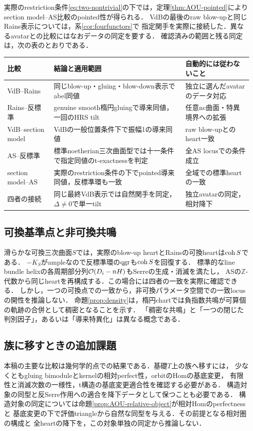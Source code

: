 実際のrestriction条件\eqref{eq:two-nontrivial}の下では，定理\ref{thm:AOU-pointed}により
section model--AS比較のpointed性が得られる．
VdBの最後のraw blow-upと同じRains表示については，系\ref{cor:fourfunctors}で
指定関手を実際に接続した．異なるavatarとの比較にはなおデータの同定を要する．
確認済みの範囲と残る同定は，次の表のとおりである．
\begin{center}
\small
\begin{tabular}{p{}p{}p{}}
\toprule
比較 & 結論と適用範囲 & 自動的には従わないこと\\
\midrule
VdB--Rains & 同じblow-up・gluing・blow-down表示でabel同値 & 独立に選んだavatarのデータ対応\\
Rains--反標準 & genuine smooth楕円gluingで導来同値，一回のHRS tilt & 任意nc曲面・特異境界への拡張\\
VdB--section model & VdBの一般位置条件下で振幅1の導来同値 & raw blow-upとのheart一致\\
AS--反標準 & 標準noetherian三次曲面型では十一条件で指定同値のt-exactnessを判定 & 全AS locusでの条件成立\\
section model--AS & 実際のrestriction条件の下でpointed導来同値，反標準環も一致 & 全域での標準heartの一致\\
四者の接続 & 同じ最終VdB表示では自然関手を同定，$\Delta\ne0$で単一tilt & 独立avatarの同定，相対降下\\
\bottomrule
\end{tabular}
\end{center}

\subsection{可換基準点と非可換共鳴}
滑らかな可換三次曲面$S$では，実際のblow-up heartとRainsの可換heartは$\operatorname{coh} S$である．
$-K_S$がampleなので反標準環の$\operatorname{qgr}$も$\operatorname{coh} S$を回復する．
標準的なline bundle helixの各周期部分列$\mathcal O(D_i-nH)$もSerreの生成・消滅を満たし，
ASの$\mathbb Z$-代数から同じheartを再構成する．この場合には四者の一致を実際に確認できる．
しかし，一つの可換点での一致から，非可換パラメータ空間での一致locusの開性を推論しない．
命題\ref{prop:density}は，楕円chartでは負指数共鳴が可算個の軌跡の合併として稠密となることを示す．
「稠密な共鳴」と「一つの閉じた判別因子」，あるいは「導来特異化」は異なる概念である．

\subsection{族に移すときの追加課題}
本稿の主要な比較は幾何学的点での結果である．基礎$T$上の族へ移すには，
少なくともgluing bimoduleとkernelの相対perfect性，orbitのHomの基底変更，
有限性と消滅次数の一様性，t構造の基底変更適合性を確認する必要がある．
構造対象の同型と反Serre作用への適合を降下データとして保つことも必要である．
構造対象の同定については命題\ref{prop:AOU-relative-object}が相対Homのperfectnessと
基底変更の下で評価triangleから自然な同型を与える．その前提となる相対圏の構成と
全heartの降下を，この対象単独の同定から推論しない．

